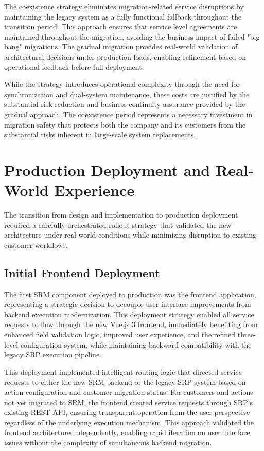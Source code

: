 The coexistence strategy eliminates migration-related service disruptions by maintaining the legacy system as a fully functional fallback throughout the transition period. This approach ensures that service level agreements are maintained throughout the migration, avoiding the business impact of failed "big bang" migrations. The gradual migration provides real-world validation of architectural decisions under production loads, enabling refinement based on operational feedback before full deployment.

While the strategy introduces operational complexity through the need for synchronization and dual-system maintenance, these costs are justified by the substantial risk reduction and business continuity assurance provided by the gradual approach. The coexistence period represents a necessary investment in migration safety that protects both the company and its customers from the substantial risks inherent in large-scale system replacements.

\section{Production Deployment and Real-World Experience}

The transition from design and implementation to production deployment required a carefully orchestrated rollout strategy that validated the new architecture under real-world conditions while minimizing disruption to existing customer workflows.

\subsection{Initial Frontend Deployment}

The first SRM component deployed to production was the frontend application, representing a strategic decision to decouple user interface improvements from backend execution modernization. This deployment strategy enabled all service requests to flow through the new Vue.js 3 frontend, immediately benefiting from enhanced field validation logic, improved user experience, and the refined three-level configuration system, while maintaining backward compatibility with the legacy SRP execution pipeline.

This deployment implemented intelligent routing logic that directed service requests to either the new SRM backend or the legacy SRP system based on action configuration and customer migration status. For customers and actions not yet migrated to SRM, the frontend created service requests through SRP's existing REST API, ensuring transparent operation from the user perspective regardless of the underlying execution mechanism. This approach validated the frontend architecture independently, enabling rapid iteration on user interface issues without the complexity of simultaneous backend migration.

